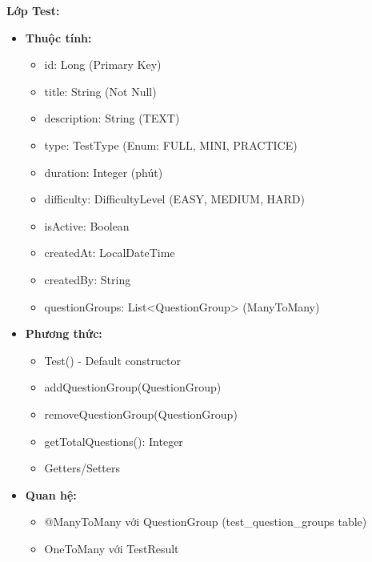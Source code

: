 \documentclass[../DoAn.tex]{subfiles}
\begin{document}
\textbf{Lớp Test:}
\begin{itemize}
    \item \textbf{Thuộc tính:}
    \begin{itemize}
        \item id: Long (Primary Key)
        \item title: String (Not Null)
        \item description: String (TEXT)
        \item type: TestType (Enum: FULL, MINI, PRACTICE)
        \item duration: Integer (phút)
        \item difficulty: DifficultyLevel (EASY, MEDIUM, HARD)
        \item isActive: Boolean
        \item createdAt: LocalDateTime
        \item createdBy: String
        \item questionGroups: List<QuestionGroup> (ManyToMany)
    \end{itemize}
    \item \textbf{Phương thức:}
    \begin{itemize}
        \item Test() - Default constructor
        \item addQuestionGroup(QuestionGroup)
        \item removeQuestionGroup(QuestionGroup)
        \item getTotalQuestions(): Integer
        \item Getters/Setters
    \end{itemize}
    \item \textbf{Quan hệ:}
    \begin{itemize}
        \item @ManyToMany với QuestionGroup (test\_question\_groups table)
        \item OneToMany với TestResult
    \end{itemize}
\end{itemize}
\end{document}
